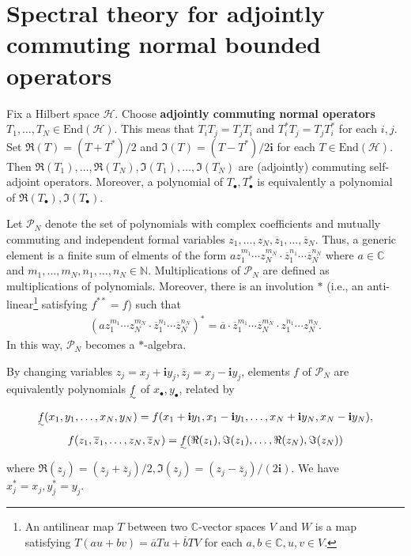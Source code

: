 \documentclass[12pt,a4paper,notitlepage]{article}
\theoremstyle{definition}
\theoremstyle{plain}
\newcommand{\mc}{\mathcal}
\newcommand{\ovl}{\overline}
\newcommand{\End}{\mathrm{End}} %
\newcommand{\im}{\mathbf{i}}
\newcommand{\blt}{\bullet}
\newcommand{\Cbb}{\mathbb C}
\newcommand{\Nbb}{\mathbb N}
\numberwithin{equation}{section}
\begin{document}
\section{Spectral theory for adjointly commuting normal bounded operators}\label{lb65}



Fix a Hilbert space $\mc H$. Choose \textbf{adjointly commuting normal operators} $T_1,\dots,T_N\in\End(\mc H)$. This meas that  $T_iT_j=T_jT_i$ and $T_i^*T_j=T_jT_i^*$ for each $i,j$.   Set $\Re(T)=(T+T^*)/2$ and $\Im (T)=(T-T^*)/{2\im}$ for each $T\in\End(\mc H)$. Then $\Re (T_1),\dots,\Re (T_N),\Im (T_1),\dots,\Im (T_N)$ are (adjointly) commuting self-adjoint operators. Moreover, a polynomial of $T_\blt,T^*_\blt$ is equivalently a polynomial of $\Re (T_\blt),\Im (T_\blt)$.

Let $\mc P_N$ \index{PN@$\mc P_N$} denote the set of polynomials with complex coefficients and mutually commuting and independent formal variables $z_1,\dots,z_N,\ovl z_1,\dots,\ovl z_N$. Thus, a generic element is a finite sum of elments of the form $az_1^{m_1}\cdots z_N^{m_N}\cdot \ovl z_1^{n_1}\cdots \ovl z_N^{n_N}$ where $a\in\Cbb$ and $m_1,\dots,m_N,n_1,\dots,n_N\in \Nbb$. Multiplications of $\mc P_N$ are defined as multiplications of polynomials. Moreover, there is an involution $*$ (i.e., an anti-linear\footnote{An antilinear map $T$ between two $\Cbb$-vector spaces $V$ and $W$ is a map satisfying $T(au+bv)=\ovl a Tu+\ovl b TV$ for each $a,b\in\Cbb,u,v\in V$.} satisfying $f^{**}=f$) such that
\begin{align*}
(az_1^{m_1}\cdots z_N^{m_N}\cdot \ovl z_1^{n_1}\cdots \ovl z_N^{n_N})^*=\ovl a\cdot \ovl z_1^{m_1}\cdots \ovl z_N^{m_N}\cdot z_1^{n_1}\cdots z_N^{n_N}.	
\end{align*}
In this way, $\mc P_N$ becomes a $*$-algebra.

By changing variables $z_j=x_j+\im y_j,\ovl z_j=x_j-\im y_j$, elements $f$ of $\mc P_N$ are equivalently polynomials $\uwave f$  of $x_\blt,y_\blt$, related by
\begin{gather*}
\uwave f(x_1,y_1,\dots,x_N,y_N)=f(x_1+\im y_1,x_1-\im y_1,\dots,x_N+\im y_N,x_N-\im y_N),	\\
f(z_1,\ovl z_1,\dots,z_N,\ovl z_N)=\uwave f(\Re(z_1),\Im(z_1),\dots,\Re(z_N),\Im(z_N))	
\end{gather*}
where $\Re(z_j)=(z_j+\ovl z_j)/2,\Im(z_j)=(z_j-\ovl z_j)/(2\im)$. We have $x_j^*=x_j,y_j^*=y_j$. %
\end{document}

